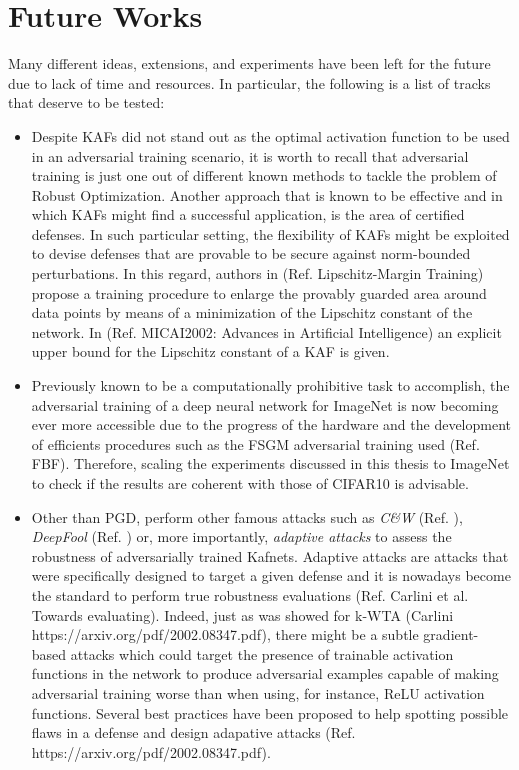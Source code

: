 \documentclass[LaM,binding=0.6cm]{./packages/sapthesis/sapthesis}
\begin{document}
        \section{Future Works}

        Many different ideas, extensions, and experiments have been left for the future due to lack of time and resources. In particular, the following is a list of tracks that deserve to be tested:
        \begin{itemize}
            \item Despite KAFs did not stand out as the optimal activation function to be used in an adversarial training scenario, it is worth to recall that adversarial training is just one 
            out of different known methods to tackle the problem of Robust Optimization. Another approach that is known to be effective and in which KAFs might find a successful
            application, is the area of certified defenses. In such particular setting, the flexibility of KAFs might be exploited to devise defenses that are provable to be secure against 
            norm-bounded perturbations. In this regard, authors in (Ref. Lipschitz-Margin Training) propose a training procedure to enlarge the provably guarded area around data points 
            by means of a minimization of the Lipschitz constant of the network. In (Ref. MICAI2002: Advances in Artificial Intelligence) an explicit upper bound for the Lipschitz
            constant of a KAF is given.

            \item Previously known to be a computationally prohibitive task to accomplish, the adversarial training of a deep neural network for ImageNet is now becoming ever more accessible 
                  due to the progress of the hardware and the development of efficients procedures such as the FSGM adversarial training used (Ref. FBF). Therefore, scaling the experiments discussed in this thesis
                  to ImageNet to check if the results are coherent with those of CIFAR10 is advisable. 

            \item Other than PGD, perform other famous attacks such as \textit{C\&W} (Ref. ), \textit{DeepFool} (Ref. ) or, more importantly, \textit{adaptive attacks} to assess the robustness of adversarially trained Kafnets. 
            Adaptive attacks are attacks that were specifically designed to target a given defense and it is nowadays become the standard to perform true robustness evaluations (Ref. Carlini et al. Towards evaluating).
            Indeed, just as was showed for k-WTA (Carlini https://arxiv.org/pdf/2002.08347.pdf), there might be a subtle gradient-based attacks which could target the presence of trainable activation functions in the network 
            to produce adversarial examples capable of making adversarial training worse than when using, for instance, ReLU activation functions. Several best practices have been proposed to help spotting possible flaws 
            in a defense and design adapative attacks (Ref. https://arxiv.org/pdf/2002.08347.pdf).
        \end{itemize}
            

    
   
    
\appendix


\backmatter
\printbibliography
\end{document}
